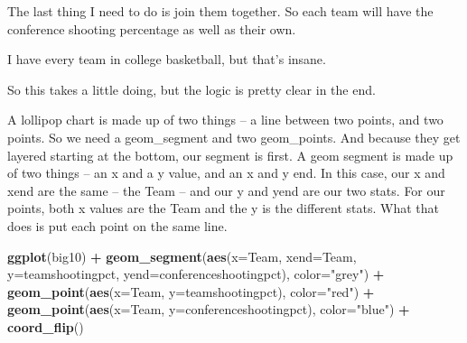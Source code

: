 \documentclass[
]{book}
\newenvironment{Shaded}{\begin{snugshade}}{\end{snugshade}}
\newcommand{\DataTypeTok}[1]{\textcolor[rgb]{0.13,0.29,0.53}{#1}}
\newcommand{\KeywordTok}[1]{\textcolor[rgb]{0.13,0.29,0.53}{\textbf{#1}}}
\newcommand{\NormalTok}[1]{#1}
\newcommand{\OperatorTok}[1]{\textcolor[rgb]{0.81,0.36,0.00}{\textbf{#1}}}
\newcommand{\StringTok}[1]{\textcolor[rgb]{0.31,0.60,0.02}{#1}}
\begin{document}
The last thing I need to do is join them together. So each team will have the conference shooting percentage as well as their own.

\begin{Shaded}
\end{Shaded}

I have every team in college basketball, but that's insane.

\begin{Shaded}
\end{Shaded}

So this takes a little doing, but the logic is pretty clear in the end.

A lollipop chart is made up of two things -- a line between two points, and two points. So we need a geom\_segment and two geom\_points. And because they get layered starting at the bottom, our segment is first. A geom segment is made up of two things -- an x and a y value, and an x and y end. In this case, our x and xend are the same -- the Team -- and our y and yend are our two stats. For our points, both x values are the Team and the y is the different stats. What that does is put each point on the same line.

\begin{Shaded}
\begin{Highlighting}[]
\KeywordTok{ggplot}\NormalTok{(big10) }\OperatorTok{+}
\StringTok{  }\KeywordTok{geom_segment}\NormalTok{(}\KeywordTok{aes}\NormalTok{(}\DataTypeTok{x=}\NormalTok{Team, }\DataTypeTok{xend=}\NormalTok{Team, }\DataTypeTok{y=}\NormalTok{teamshootingpct, }\DataTypeTok{yend=}\NormalTok{conferenceshootingpct), }\DataTypeTok{color=}\StringTok{"grey"}\NormalTok{) }\OperatorTok{+}\StringTok{ }
\StringTok{  }\KeywordTok{geom_point}\NormalTok{(}\KeywordTok{aes}\NormalTok{(}\DataTypeTok{x=}\NormalTok{Team, }\DataTypeTok{y=}\NormalTok{teamshootingpct), }\DataTypeTok{color=}\StringTok{"red"}\NormalTok{) }\OperatorTok{+}\StringTok{ }
\StringTok{  }\KeywordTok{geom_point}\NormalTok{(}\KeywordTok{aes}\NormalTok{(}\DataTypeTok{x=}\NormalTok{Team, }\DataTypeTok{y=}\NormalTok{conferenceshootingpct), }\DataTypeTok{color=}\StringTok{"blue"}\NormalTok{) }\OperatorTok{+}
\StringTok{  }\KeywordTok{coord_flip}\NormalTok{()}
\end{Highlighting}
\end{Shaded}
\end{document}
